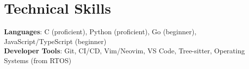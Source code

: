 \documentclass[letterpaper,11pt]{article}
\begin{document}
\section{Technical Skills}
 \begin{itemize}[leftmargin=0.15in, label={}]
    \small{\item{
     \textbf{Languages}{: C (proficient), Python (proficient), Go (beginner), JavaScript/TypeScript (beginner)} \\
     \textbf{Developer Tools}{: Git, CI/CD, Vim/Neovim, VS Code, Tree-sitter, Operating Systems (from RTOS)} \\
    }}
 \end{itemize}


\end{document}
